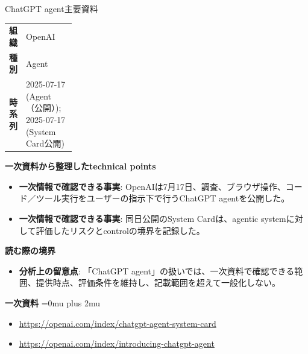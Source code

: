 \begin{technicalnote}{ChatGPT agent}{主要資料}
\begingroup
\begin{tabularx}{\linewidth}{@{}>{\bfseries}p{0.22\linewidth}X@{}}
組織 & OpenAI \\
種別 & Agent \\
時系列 & 2025-07-17 (Agent（公開）); 2025-07-17 (System Card公開) \\
\end{tabularx}
\smallskip
{\bfseries 一次資料から整理したtechnical points}
\begin{itemize}[leftmargin=1.5em,itemsep=0.35em]
\item \textbf{一次情報で確認できる事実}: OpenAIは7月17日、調査、ブラウザ操作、コード／ツール実行をユーザーの指示下で行うChatGPT agentを公開した。
\item \textbf{一次情報で確認できる事実}: 同日公開のSystem Cardは、agentic systemに対して評価したリスクとcontrolの境界を記録した。
\end{itemize}
\begin{minipage}{\linewidth}
{\bfseries 読む際の境界}
\begin{itemize}[leftmargin=1.5em,itemsep=0.35em]
\item \textbf{分析上の留意点}: 「ChatGPT agent」の扱いでは、一次資料で確認できる範囲、提供時点、評価条件を維持し、記載範囲を超えて一般化しない。
\end{itemize}
\begin{samepage}
{\bfseries 一次資料}
\begingroup\sloppy
\Urlmuskip=0mu plus 2mu\relax
\begin{itemize}[leftmargin=1.5em,itemsep=0.25em]
\item {\scriptsize\url{https://openai.com/index/chatgpt-agent-system-card}}
\item {\scriptsize\url{https://openai.com/index/introducing-chatgpt-agent}}
\end{itemize}
\endgroup
\end{samepage}
\end{minipage}
\endgroup
\end{technicalnote}
\medskip

